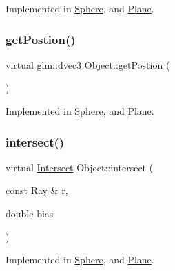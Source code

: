 Implemented in \mbox{\hyperlink{class_sphere_ac5c6bbcd43b8caabe4a23ba3e53d414a}{Sphere}}, and \mbox{\hyperlink{class_plane_a05e58028f795833a1ee68b374597fa3a}{Plane}}.

\mbox{\label{class_object_a71cb3da0e19b83f2558bf406abc9db68}} 
\subsubsection{\texorpdfstring{get\+Postion()}{getPostion()}}
{\footnotesize\ttfamily virtual glm\+::dvec3 Object\+::get\+Postion (\begin{DoxyParamCaption}{ }\end{DoxyParamCaption})\hspace{0.3cm}{\ttfamily [pure virtual]}}



Implemented in \mbox{\hyperlink{class_sphere_abcc01a6057eb30df9605ce3786b6c47c}{Sphere}}, and \mbox{\hyperlink{class_plane_ab49db9185e5489809dc13135a5231109}{Plane}}.

\mbox{\label{class_object_a16d022cf54624baea89c542a44e6db26}} 
\subsubsection{\texorpdfstring{intersect()}{intersect()}}
{\footnotesize\ttfamily virtual \mbox{\hyperlink{struct_intersect}{Intersect}} Object\+::intersect (\begin{DoxyParamCaption}\item[{const \mbox{\hyperlink{struct_ray}{Ray}} \&}]{r,  }\item[{double}]{bias }\end{DoxyParamCaption})\hspace{0.3cm}{\ttfamily [pure virtual]}}



Implemented in \mbox{\hyperlink{class_sphere_a3ba8c2a4bc8108b244f35e71c14b952d}{Sphere}}, and \mbox{\hyperlink{class_plane_ab636b2a91165088ba60dac02aaf89785}{Plane}}.

\mbox{\label{class_object_ad81452e5a38455eff025d85ef1da7307}} 
